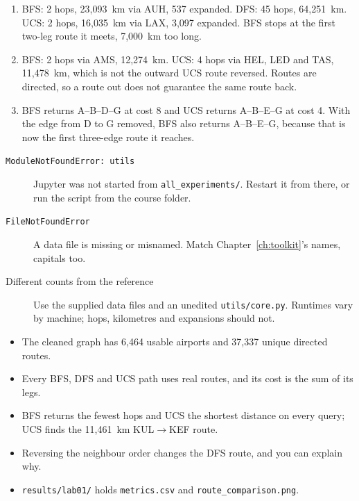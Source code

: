 \begin{expectedfindings}
\begin{enumerate}
  \item BFS: 2 hops, 23,093~km via AUH, 537 expanded. DFS: 45 hops, 64,251~km. UCS: 2 hops, 16,035~km via LAX, 3,097 expanded. BFS stops at the first two-leg route it meets, 7,000~km too long.
  \item BFS: 2 hops via AMS, 12,274~km. UCS: 4 hops via HEL, LED and TAS, 11,478~km, which is not the outward UCS route reversed. Routes are directed, so a route out does not guarantee the same route back.
  \item BFS returns A--B--D--G at cost 8 and UCS returns A--B--E--G at cost 4. With the edge from D to G removed, BFS also returns A--B--E--G, because that is now the first three-edge route it reaches.
\end{enumerate}
\end{expectedfindings}

\begin{troubleshoot}
\begin{description}
  \item[\texttt{ModuleNotFoundError: utils}] Jupyter was not started from \texttt{all\_experiments/}. Restart it from there, or run the script from the course folder.
  \item[\texttt{FileNotFoundError}] A data file is missing or misnamed. Match Chapter~\ref{ch:toolkit}'s names, capitals too.
  \item[Different counts from the reference] Use the supplied data files and an unedited \texttt{utils/core.py}. Runtimes vary by machine; hops, kilometres and expansions should not.
\end{description}
\end{troubleshoot}

\begin{verification}
\begin{itemize}
  \item The cleaned graph has 6,464 usable airports and 37,337 unique directed routes.
  \item Every BFS, DFS and UCS path uses real routes, and its cost is the sum of its legs.
  \item BFS returns the fewest hops and UCS the shortest distance on every query; UCS finds the 11,461~km KUL$\to$KEF route.
  \item Reversing the neighbour order changes the DFS route, and you can explain why.
  \item \texttt{results/lab01/} holds \texttt{metrics.csv} and \texttt{route\_comparison.png}.
\end{itemize}
\end{verification}

